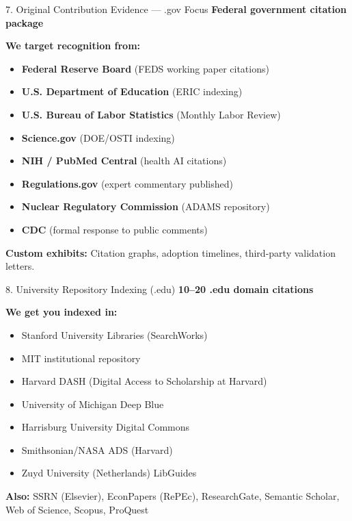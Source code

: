 \documentclass[aspectratio=169, 10pt]{beamer}
\begin{document}
		
	\begin{frame}{7. Original Contribution Evidence — .gov Focus}
		\faMicrochip \hspace{0.2cm} \textbf{Federal government citation package}
		
		\textbf{We target recognition from:}
		\begin{itemize}
			\item \textbf{Federal Reserve Board} (FEDS working paper citations)
			\item \textbf{U.S. Department of Education} (ERIC indexing)
			\item \textbf{U.S. Bureau of Labor Statistics} (Monthly Labor Review)
			\item \textbf{Science.gov} (DOE/OSTI indexing)
			\item \textbf{NIH / PubMed Central} (health AI citations)
			\item \textbf{Regulations.gov} (expert commentary published)
			\item \textbf{Nuclear Regulatory Commission} (ADAMS repository)
			\item \textbf{CDC} (formal response to public comments)
		\end{itemize}
		
		\textbf{Custom exhibits:} Citation graphs, adoption timelines, third-party validation letters.
	\end{frame}
	
	\begin{frame}{8. University Repository Indexing (.edu)}
		\faUniversity \hspace{0.2cm} \textbf{10–20 .edu domain citations}
		
		\textbf{We get you indexed in:}
		\begin{itemize}
			\item Stanford University Libraries (SearchWorks)
			\item MIT institutional repository
			\item Harvard DASH (Digital Access to Scholarship at Harvard)
			\item University of Michigan Deep Blue
			\item Harrisburg University Digital Commons
			\item Smithsonian/NASA ADS (Harvard)
			\item Zuyd University (Netherlands) LibGuides
		\end{itemize}
		
		\textbf{Also:} SSRN (Elsevier), EconPapers (RePEc), ResearchGate, Semantic Scholar, Web of Science, Scopus, ProQuest
	\end{frame}
	
\end{document}
